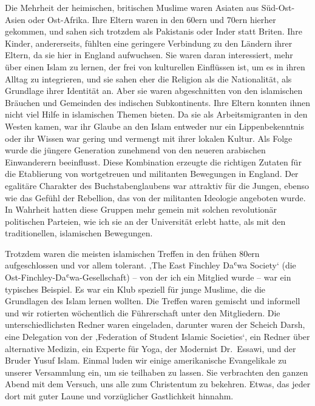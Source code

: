 \documentclass[12pt]{memoir}
\def\`{ʿ} %
\def\–{\hskip0pt-\hskip0pt}
\begin{document}
Die Mehrheit der heimischen, britischen Muslime
waren Asiaten aus Süd\–Ost\–Asien oder Ost\–Afrika.
Ihre Eltern waren in den 60ern und 70ern hierher gekommen,
und sahen sich trotzdem als Pakistanis oder Inder statt Briten.
Ihre Kinder, andererseits,
fühlten eine geringere Verbindung zu den Ländern ihrer Eltern,
da sie hier in England aufwuchsen.
Sie waren daran interessiert, mehr über einen Islam zu lernen,
der frei von kulturellen Einflüssen ist,
um es in ihren Alltag zu integrieren,
und sie sahen eher die Religion als die Nationalität,
als Grundlage ihrer Identität an.
Aber sie waren abgeschnitten von den islamischen Bräuchen
und Gemeinden des indischen Subkontinents.
Ihre Eltern konnten ihnen nicht viel Hilfe in islamischen Themen bieten.
Da sie als Arbeitsmigranten in den Westen kamen,
war ihr Glaube an den Islam entweder nur ein Lippenbekenntnis
oder ihr Wissen war gering und vermengt mit ihrer lokalen Kultur.
Als Folge wurde die jüngere Generation zunehmend
von den neueren arabischen Einwanderern beeinflusst.
Diese Kombination erzeugte die richtigen Zutaten für
die Etablierung von wortgetreuen und militanten Bewegungen in England.
Der egalitäre Charakter des Buchstabenglaubens war attraktiv für die Jungen,
ebenso wie das Gefühl der Rebellion,
das von der militanten Ideologie angeboten wurde.
In Wahrheit hatten diese Gruppen mehr gemein
mit solchen revolutionär politischen Parteien,
wie ich sie an der Universität erlebt hatte,
als mit den traditionellen, islamischen Bewegungen.

Trotzdem waren die meisten islamischen Treffen in den frühen 80ern
aufgeschlossen und vor allem tolerant.
‚The East Finchley Da\`wa Society‘ (die Ost\–Finchley\–Da\`wa\–Gesellschaft)
– von der ich ein Mitglied wurde – war ein typisches Beispiel.
Es war ein Klub speziell für junge Muslime,
die die Grundlagen des Islam lernen wollten.
Die Treffen waren gemischt und informell
und wir rotierten wöchentlich die Führerschaft unter den Mitgliedern.
Die unterschiedlichsten Redner waren eingeladen,
darunter waren der Scheich Darsh,
eine Delegation von der ‚Federation of Student Islamic Societies‘,
ein Redner über alternative Medizin, ein Experte für Yoga,
der Modernist Dr.\ Essawi, und der Bruder Yusuf Islam.
Einmal luden wir einige amerikanische Evangelikale
zu unserer Versammlung ein, um sie teilhaben zu lassen.
Sie verbrachten den ganzen Abend mit dem Versuch,
uns alle zum Christentum zu bekehren.
Etwas, das jeder dort mit guter Laune und vorzüglicher Gastlichkeit hinnahm.
\end{document}
